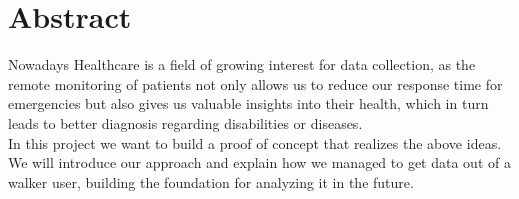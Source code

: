 \begingroup
\let\clearpage\relax
\let\cleardoublepage\relax
\let\cleardoublepage\relax

\chapter*{Abstract}
\bigskip
\bigskip
\bigskip
Nowadays Healthcare is a field of growing interest for data collection, as the remote monitoring of patients not only allows us to reduce our response time for emergencies but also gives us valuable insights into their health, which in turn leads to better diagnosis regarding disabilities or diseases.\\

In this project we want to build a proof of concept that realizes the above ideas. We will introduce our approach and explain how we managed to get data out of a walker user, building the foundation for analyzing it in the future.
\vfill

\endgroup			

\vfill